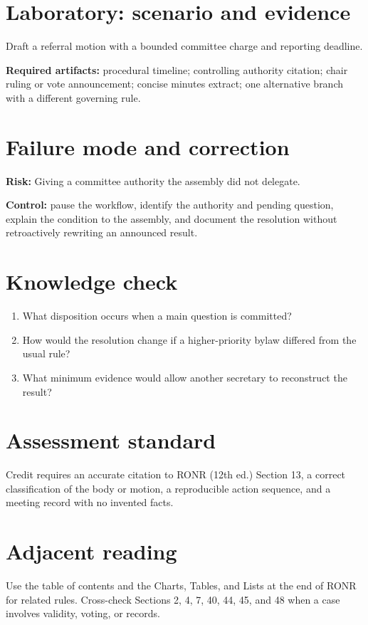 \documentclass[11pt]{article}
\begin{document}
\section{Laboratory: scenario and evidence}
Draft a referral motion with a bounded committee charge and reporting deadline.

\textbf{Required artifacts:} procedural timeline; controlling authority citation; chair ruling or vote announcement; concise minutes extract; one alternative branch with a different governing rule.

\section{Failure mode and correction}
\textbf{Risk:} Giving a committee authority the assembly did not delegate.

\textbf{Control:} pause the workflow, identify the authority and pending question, explain the condition to the assembly, and document the resolution without retroactively rewriting an announced result.

\section{Knowledge check}
\begin{enumerate}[leftmargin=*,itemsep=4pt]
\item What disposition occurs when a main question is committed?
\item How would the resolution change if a higher-priority bylaw differed from the usual rule?
\item What minimum evidence would allow another secretary to reconstruct the result?
\end{enumerate}

\section{Assessment standard}
Credit requires an accurate citation to RONR (12th ed.) Section 13, a correct classification of the body or motion, a reproducible action sequence, and a meeting record with no invented facts.

\section{Adjacent reading}
Use the table of contents and the Charts, Tables, and Lists at the end of RONR for related rules. Cross-check Sections 2, 4, 7, 40, 44, 45, and 48 when a case involves validity, voting, or records.
\end{document}
